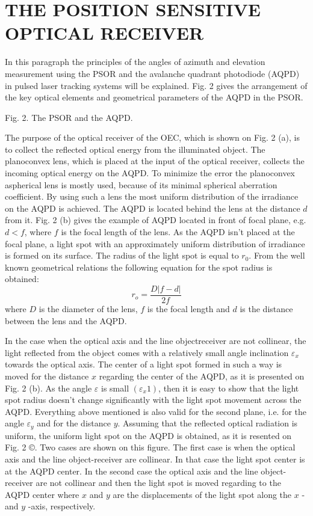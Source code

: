 \documentclass[10pt]{article}
\begin{document}
\section{THE POSITION SENSITIVE OPTICAL RECEIVER}
In this paragraph the principles of the angles of azimuth and elevation measurement using the PSOR and the avalanche quadrant photodiode (AQPD) in pulsed laser tracking systems will be explained. Fig. 2 gives the arrangement of the key optical elements and geometrical parameters of the AQPD in the PSOR.

Fig. 2. The PSOR and the AQPD.

The purpose of the optical receiver of the OEC, which is shown on Fig. 2 (a), is to collect the reflected optical energy from the illuminated object. The planoconvex lens, which is placed at the input of the optical receiver, collects the incoming optical energy on the AQPD. To minimize the error the planoconvex aspherical lens is mostly used, because of its minimal spherical aberration coefficient. By using such a lens the most uniform distribution of the irradiance on the AQPD is achieved. The AQPD is located behind the lens at the distance \(d\) from it. Fig. 2 (b) gives the example of AQPD located in front of focal plane, e.g. \(d<f\), where \(f\) is the focal length of the lens. As the AQPD isn't placed at the focal plane, a light spot with an approximately uniform distribution of irradiance is formed on its surface. The radius of the light spot is equal to \(r_{0}\). From the well known geometrical relations the following equation for the spot radius is obtained:
\[
r_{o}=\frac{D|f-d|}{2 f}
\]
where \(D\) is the diameter of the lens, \(f\) is the focal length and \(d\) is the distance between the lens and the AQPD.

In the case when the optical axis and the line objectreceiver are not collinear, the light reflected from the object comes with a relatively small angle inclination \(\varepsilon_{x}\) towards the optical axis. The center of a light spot formed in such a way is moved for the distance \(x\) regarding the center of the AQPD, as it is presented on Fig. 2 (b). As the angle \(\varepsilon\) is small \(\left(\varepsilon_{x} 1\right)\), then it is easy to show that the light spot radius doesn't change significantly with the light spot movement across the AQPD. Everything above mentioned is also valid for the second plane, i.e. for the angle \(\varepsilon_{y}\) and for the distance \(y\). Assuming that the reflected optical radiation is uniform, the uniform light spot on the AQPD is obtained, as it is resented on Fig. 2 ©. Two cases are shown on this figure. The first case is when the optical axis and the line object-receiver are collinear. In that case the light spot center is at the AQPD center. In the second case the optical axis and the line object-receiver are not collinear and then the light spot is moved regarding to the AQPD center where \(x\) and \(y\) are the displacements of the light spot along the \(x\) - and \(y\) -axis, respectively.
\end{document}
